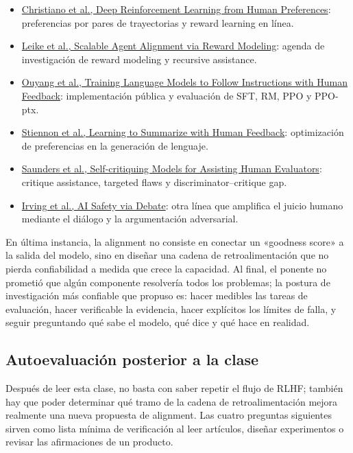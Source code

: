 \begin{itemize}
  \item \href{https://arxiv.org/abs/1706.03741}{Christiano et al., Deep Reinforcement Learning from Human Preferences}: preferencias por pares de trayectorias y reward learning en línea.
  \item \href{https://arxiv.org/abs/1811.07871}{Leike et al., Scalable Agent Alignment via Reward Modeling}: agenda de investigación de reward modeling y recursive assistance.
  \item \href{https://arxiv.org/abs/2203.02155}{Ouyang et al., Training Language Models to Follow Instructions with Human Feedback}: implementación pública y evaluación de SFT, RM, PPO y PPO-ptx.
  \item \href{https://arxiv.org/abs/2009.01325}{Stiennon et al., Learning to Summarize with Human Feedback}: optimización de preferencias en la generación de lenguaje.
  \item \href{https://arxiv.org/abs/2206.05802}{Saunders et al., Self-critiquing Models for Assisting Human Evaluators}: critique assistance, targeted flaws y discriminator--critique gap.
  \item \href{https://arxiv.org/abs/1805.00899}{Irving et al., AI Safety via Debate}: otra línea que amplifica el juicio humano mediante el diálogo y la argumentación adversarial.
\end{itemize}

En última instancia, la alignment no consiste en conectar un «goodness score» a la salida del modelo, sino en diseñar una cadena de retroalimentación que no pierda confiabilidad a medida que crece la capacidad. Al final, el ponente no prometió que algún componente resolvería todos los problemas; la postura de investigación más confiable que propuso es: hacer medibles las tareas de evaluación, hacer verificable la evidencia, hacer explícitos los límites de falla, y seguir preguntando qué sabe el modelo, qué dice y qué hace en realidad.

\subsection{Autoevaluación posterior a la clase}

Después de leer esta clase, no basta con saber repetir el flujo de RLHF; también hay que poder determinar qué tramo de la cadena de retroalimentación mejora realmente una nueva propuesta de alignment. Las cuatro preguntas siguientes sirven como lista mínima de verificación al leer artículos, diseñar experimentos o revisar las afirmaciones de un producto.

